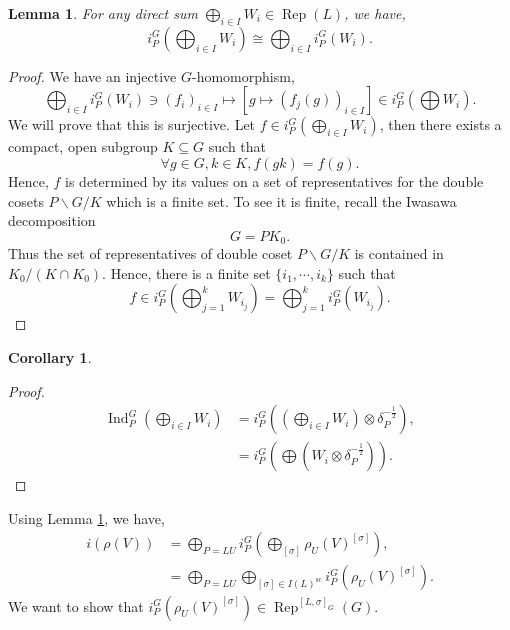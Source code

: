 \documentclass[8pt]{article}
\newtheorem{lemma}{Lemma}[section]
\newtheorem{corollary}{Corollary} [section]
\DeclareMathOperator{\Ind}{Ind}
\DeclareMathOperator{\Rep}{Rep}
\DeclareMathOperator{\supcus}{sc}
\begin{document}
\begin{lemma}
  \label{lemma_88}
  For any direct sum $\bigoplus_{i\in I}W_i\in\Rep(L)$, we have,
  \begin{equation*}
    i_P^G\left(\bigoplus_{i\in I}W_i\right) \cong\bigoplus_{i\in I}i_P^G(W_i).
  \end{equation*}
\end{lemma}

\begin{proof}
  We have an injective $G$-homomorphism,
  \begin{equation*}
    \bigoplus_{i\in I}i_P^G(W_i)\ni(f_i)_{i\in I}\mapsto [g\mapsto (f_j(g))_{i\in I}]\in i_P^G\left(\bigoplus W_i\right).
  \end{equation*}
  We will prove that this is surjective. Let $f\in i_P^G\left(\bigoplus_{i\in I}W_i\right)$, then there exists a compact, open subgroup $K\subseteq G$ such that 
  \begin{equation*}
    \forall g\in G,k\in K, f(gk) = f(g).
  \end{equation*}
  Hence, $f$ is determined by its values on a set of representatives for the double cosets $P\backslash G/K$ which is a finite set. To see it is finite, recall the Iwasawa decomposition
  \begin{equation*}
    G = P K_0.
  \end{equation*}
  Thus the set of representatives of double coset $P\backslash G/K$ is contained in $K_0/(K\cap K_0)$. Hence, there is a finite set $\{i_1,\cdots,i_k\}$ such that 
  \begin{equation*}
    f\in i_P^G\left(\bigoplus_{j=1}^k W_{i_j}\right) = \bigoplus_{j=1}^k i_P^G(W_{i_j}).
  \end{equation*}
\end{proof}

\begin{corollary}
  
\end{corollary}

\begin{proof}
  \begin{align*}
    \Ind_P^G\left(\bigoplus_{i\in I}W_i\right) & = i_P^G\left(\left(\bigoplus_{i\in I}W_i\right)\otimes\delta_P^{-{\frac 1 2}}\right),\\
    & = i_P^G\left(\bigoplus(W_i\otimes\delta_P^{-{\frac 1 2}})\right).
  \end{align*}
\end{proof}

Using Lemma \ref{lemma_88}, we have,
\begin{align*}
  i(\rho(V)) & = \bigoplus_{P=LU}i_P^G\left(\bigoplus_{[\sigma]}\rho_U(V)^{[\sigma]}\right),\\
  & = \bigoplus_{P=LU}\bigoplus_{[\sigma]\in I(L)^{\supcus}}i_P^G(\rho_U(V)^{[\sigma]}).
\end{align*}
We want to show that $i_P^G(\rho_U(V)^{[\sigma]})\in\Rep^{[L,\sigma]_G}(G)$. 
\end{document}
